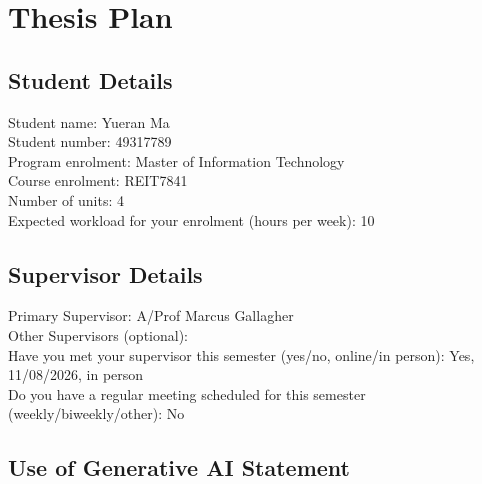 \documentclass[12pt,openany,a4paper]{book}
\begin{document}
\section*{Thesis Plan}
\pagestyle{empty}

\subsection*{Student Details}

Student name: Yueran Ma\\
Student number: 49317789\\
Program enrolment: Master of Information Technology\\
Course enrolment: REIT7841\\
Number of units: 4\\
Expected workload for your enrolment (hours per week): 10

\subsection*{Supervisor Details}

Primary Supervisor: A/Prof Marcus Gallagher\\
Other Supervisors (optional): \\
Have you met your supervisor this semester (yes/no, online/in person): Yes, 11/08/2026, in person\\
Do you have a regular meeting scheduled for this semester (weekly/biweekly/other): No


\subsection*{Use of Generative AI Statement}
\end{document}
